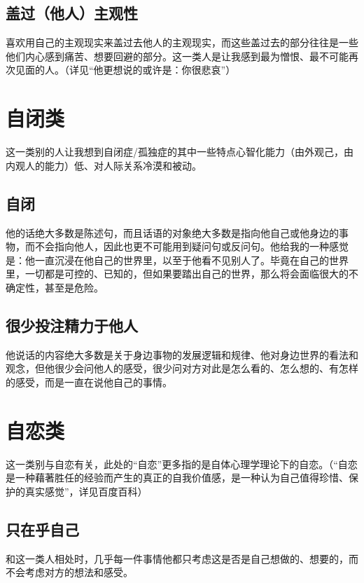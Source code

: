 \subsection*{盖过（他人）主观性}

喜欢用自己的主观现实来盖过去他人的主观现实，而这些盖过去的部分往往是一些他们内心感到痛苦、想要回避的部分。这一类人是让我感到最为憎恨、最不可能再次见面的人。（详见“他更想说的或许是：你很悲哀”）


\section*{自闭类}

这一类别的人让我想到自闭症/孤独症的其中一些特点\pozhehao{}心智化能力（由外观己，由内观人的能力）低、对人际关系冷漠和被动。

\subsection*{自闭}

他的话绝大多数是陈述句，而且话语的对象绝大多数是指向他自己或他身边的事物，而不会指向他人，因此也更不可能用到疑问句或反问句。他给我的一种感觉是：他一直沉浸在他自己的世界里，以至于他看不见别人了。毕竟在自己的世界里，一切都是可控的、已知的，但如果要踏出自己的世界，那么将会面临很大的不确定性，甚至是危险。

\subsection*{很少投注精力于他人}

他说话的内容绝大多数是关于身边事物的发展逻辑和规律、他对身边世界的看法和观念，但他很少会问他人的感受，很少问对方对此是怎么看的、怎么想的、有怎样的感受，而是一直在说他自己的事情。


\section*{自恋类}

这一类别与自恋有关，此处的“自恋”更多指的是自体心理学理论下的自恋。（“自恋是一种藉著胜任的经验而产生的真正的自我价值感，是一种认为自己值得珍惜、保护的真实感觉”，详见百度百科）

\subsection*{只在乎自己}

和这一类人相处时，几乎每一件事情他都只考虑这是否是自己想做的、想要的，而不会考虑对方的想法和感受。

